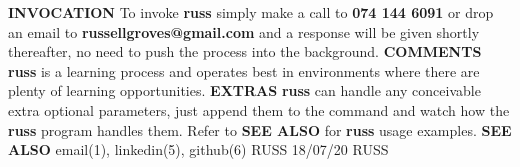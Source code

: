 \documentclass[10pt,a4paper]{altacv}
\begin{document}
\begin{paracol}{2}
\begin{tcolorbox}[colback=black!5!white,colframe=red!75!black]
  \newline
  \textbf{INVOCATION} \newline
  To invoke \textbf{russ} simply make a call to \textbf{074 144 6091} or drop an email to \textbf{russellgroves@gmail.com} and a response will be given shortly thereafter, no need to push the process into the background. \newline
  \newline
  \textbf{COMMENTS} \newline
  \textbf{russ} is a learning process and operates best in environments where there are plenty of learning opportunities. \newline
  \newline
  \textbf{EXTRAS} \newline
  \textbf{russ} can handle any conceivable extra optional parameters, just append them to the command and watch how the \textbf{russ} program handles them. \newline
  \newline
  Refer to \textbf{SEE ALSO} for \textbf{russ} usage examples. \newline
  \newline
  \textbf{SEE ALSO} \newline
  email(1), linkedin(5), github(6) \newline
  \newline
  RUSS \hspace{1em} 18/07/20 \hspace{1em} RUSS
\end{tcolorbox}


\end{paracol}
\end{document}
